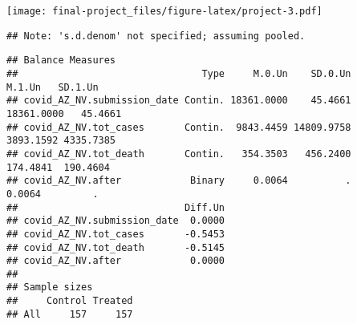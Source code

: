 \documentclass[
]{article}
\newenvironment{Shaded}{\begin{snugshade}}{\end{snugshade}}
\newcommand{\AttributeTok}[1]{\textcolor[rgb]{0.77,0.63,0.00}{#1}}
\newcommand{\CommentTok}[1]{\textcolor[rgb]{0.56,0.35,0.01}{\textit{#1}}}
\newcommand{\DecValTok}[1]{\textcolor[rgb]{0.00,0.00,0.81}{#1}}
\newcommand{\DocumentationTok}[1]{\textcolor[rgb]{0.56,0.35,0.01}{\textbf{\textit{#1}}}}
\newcommand{\FunctionTok}[1]{\textcolor[rgb]{0.00,0.00,0.00}{#1}}
\newcommand{\NormalTok}[1]{#1}
\newcommand{\OtherTok}[1]{\textcolor[rgb]{0.56,0.35,0.01}{#1}}
\newcommand{\SpecialCharTok}[1]{\textcolor[rgb]{0.00,0.00,0.00}{#1}}
\newcommand{\StringTok}[1]{\textcolor[rgb]{0.31,0.60,0.02}{#1}}
\begin{document}
\texttt{[image: final-project\_files/figure-latex/project-3.pdf]}

\begin{Shaded}
\end{Shaded}

\begin{verbatim}
## Note: 's.d.denom' not specified; assuming pooled.
\end{verbatim}

\begin{verbatim}
## Balance Measures
##                                Type     M.0.Un    SD.0.Un     M.1.Un   SD.1.Un
## covid_AZ_NV.submission_date Contin. 18361.0000    45.4661 18361.0000   45.4661
## covid_AZ_NV.tot_cases       Contin.  9843.4459 14809.9758  3893.1592 4335.7385
## covid_AZ_NV.tot_death       Contin.   354.3503   456.2400   174.4841  190.4604
## covid_AZ_NV.after            Binary     0.0064          .     0.0064         .
##                             Diff.Un
## covid_AZ_NV.submission_date  0.0000
## covid_AZ_NV.tot_cases       -0.5453
## covid_AZ_NV.tot_death       -0.5145
## covid_AZ_NV.after            0.0000
## 
## Sample sizes
##     Control Treated
## All     157     157
\end{verbatim}

\begin{Shaded}
\end{Shaded}
\end{document}
